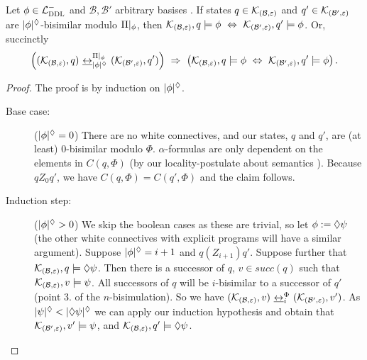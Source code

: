 \documentclass{llncs}
\newcommand{\dlangm}{{\mathcal L}_{\acro{DDL}}^{-}}
\newcommand{\kmod}[2]{{\cal K}_{(#1,#2)}}
\newcommand{\views}{\mathcal B}
\newcommand{\sem}{\varepsilon}
\newcommand{\depth}[1]{|{#1}|^\adia}
\newcommand{\bisim}{\underline{\leftrightarrow}}
\begin{document}
\begin{proposition} Let $\phi \in \dlangm$ and $\views, \views'$ arbitrary basises . If states $q \in \kmod \views \sem$ and $q' \in \kmod {\views'} \sem$ are $\depth{\phi}$-bisimilar modulo ${\Pi}|_{\phi}$, then $\kmod \views \sem, q \models \phi ~\Leftrightarrow~ \kmod {\views'} \sem , q' \models \phi$. Or, succinctly
$$ \left((\kmod \views \sem, q) ~\bisim_{\depth{\phi}}^{\restr \Pi \phi}~ (\kmod {\views'} \sem, q')\right) ~\Rightarrow~ \left(\kmod \views \sem, q \models \phi ~\Leftrightarrow~ \kmod {\views'} \sem, q' \models \phi\right).$$
\end{proposition}

\begin{proof} The proof is by induction on $\depth{\phi}$. 
\begin{description}
\item[Base case:] ($\depth{\phi} = 0$) There are no white connectives, and our states, $q$ and $q'$, are (at least) 0-bisimilar modulo $\Phi$. $\alpha$-formulas  are only dependent on the elements in $C(q, \Phi)$ (by our locality-postulate about semantics ). Because $q Z_0 q'$, we have $C(q, \Phi) = C(q', \Phi)$ and the claim follows. 
\item[Induction step:] ($\depth{\phi} > 0$) We skip the boolean cases as these are trivial, so let $\phi := \lozenge \psi$ (the other white connectives with explicit programs will have a similar argument). Suppose $\depth{\phi} = i + 1$ and $q (Z_{i+1}) q'$. Suppose further that $\kmod \views \sem, q \models \adia \psi$. Then there is a successor of $q$, $v \in succ(q)$ such that $\kmod \views \sem, v \models \psi$. All successors of $q$ will be $i$-bisimilar to a successor of $q'$ (point 3. of the $n$-bisimulation). So we have $(\kmod \views \sem, v)~\bisim_i^{\Phi}~(\kmod {\views'} \sem, v')$. As $\depth{\psi} < \depth{\adia \psi}$ we can apply our induction hypothesis and obtain that $\kmod {\views'} \sem, v' \models \psi$, and $\kmod {\views} \sem, q' \models \adia \psi$.
\end{description}

\end{proof}



\end{document}
